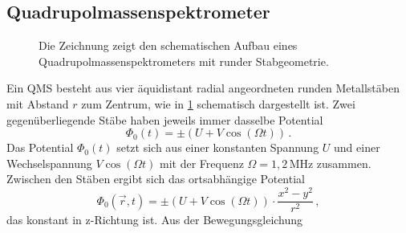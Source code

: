 \subsection{Quadrupolmassenspektrometer}\label{subsec:quadrupolmassenspektrometer}
\begin{figure}[h]
 	\centering
	\caption[Quadrupolmassenspektrometer,
	schematisch]{Die Zeichnung zeigt den schematischen Aufbau eines
	Quadrupolmassenspektrometers mit runder
	Stabgeometrie.}\label{fig:quadrupolmassenspektrometer}
\end{figure}
Ein QMS besteht aus vier äquidistant radial angeordneten runden
Metallstäben mit Abstand $r$ zum Zentrum, wie in
\ref{fig:quadrupolmassenspektrometer} schematisch dargestellt ist. Zwei
gegenüberliegende Stäbe haben jeweils immer dasselbe Potential
\begin{equation}\label{eq:qms_potential_0}
	\Phi_0(t)=\pm\left(U+V\cos{(\Omega t)}\right)\,.
\end{equation}
Das Potential $\Phi_0(t)$ setzt sich aus einer konstanten Spannung $U$
und einer Wechselspannung $V\cos{(\Omega t)}$ mit der Frequenz $\Omega=1,2\,$MHz
zusammen. Zwischen den Stäben ergibt sich das ortsabhängige Potential
\begin{equation}\label{eq:qms_potential_ort}
	\Phi_0(\vec{r},t)=\pm\left(U+V\cos{(\Omega
	t)}\right)\cdot\frac{x^2-y^2}{r^2}\,,
\end{equation}
das konstant in z-Richtung ist. Aus der Bewegungsgleichung
